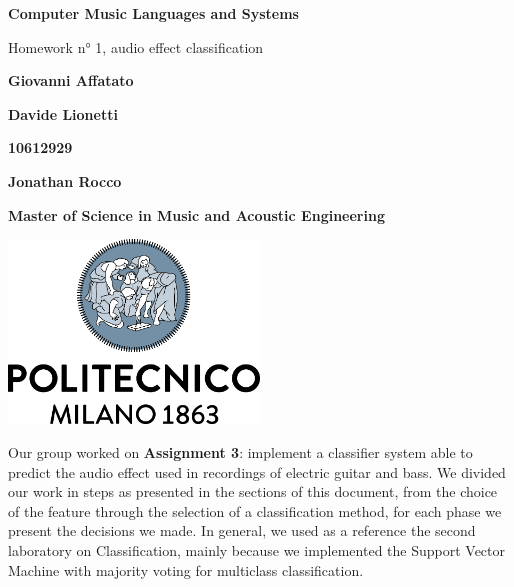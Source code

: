\documentclass[a4paper,12pt]{report}
\begin{document}
\begin{titlepage}
\begin{center}
    \vspace*{1cm}
    
    \Huge
    \textbf{Computer Music Languages and Systems}
    
    \vspace{0.5cm}
    \LARGE
    Homework n° 1, audio effect classification

    \vspace{1 cm}
    
    \textbf{Giovanni Affatato}
    
    \vspace{0.5cm}
    
    \textbf{Davide Lionetti}
     
    \vspace{0.5cm}
    
    \textbf{10612929}
     
    
    \vspace{0.5cm}
    
    \textbf{Jonathan Rocco}
    
    \vspace{0.5cm}
    
    \vfill
    
   
    \date{April 2021}
    \vspace{0.3cm}
    \textbf{Master of Science in Music and Acoustic Engineering}
    
    \vspace{0.8cm}
    
    \includegraphics[width=0.5\textwidth]{logo_positivo.png}
    
\end{center}
\end{titlepage}


\abstract{}
Our group worked on \textbf{Assignment 3}: implement a 			  	classifier system able to predict the audio effect used in 			 	recordings of electric guitar and bass. We divided our work in 		 	steps as presented in the sections of this document, from the  	      	choice of the feature through the selection of a classification 		method, for each phase we present the decisions we made. In 			general, we used as a reference the second laboratory on 				Classification, mainly because we implemented the Support Vector 	Machine with majority voting for multiclass classification.
\endabstract{}
\end{document}
